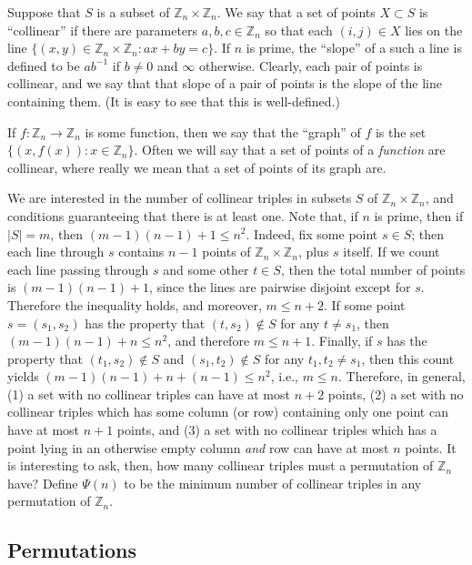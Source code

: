 \documentclass[12pt]{article}
\newcommand{\Z}{{\mathbb Z}}
\begin{document}
Suppose that $S$ is a subset of $\Z_n \times \Z_n$.  We say that a set of points $X \subset S$ is ``collinear'' if there are parameters $a,b,c \in \Z_n$ so that each $(i,j) \in X$ lies on the line $\{(x,y) \in \Z_n \times \Z_n : ax + by = c\}$.  If $n$ is prime, the ``slope'' of a such a line is defined to be $ab^{-1}$ if $b \neq 0$ and $\infty$ otherwise.  Clearly, each pair of points is collinear, and we say that that slope of a pair of points is the slope of the line containing them.  (It is easy to see that this is well-defined.)

If $f : \Z_n \rightarrow \Z_n$ is some function, then we say that the ``graph'' of $f$ is the set $\{(x,f(x)):x \in \Z_n\}$.  Often we will say that a set of points of a {\it function} are collinear, where really we mean that a set of points of its graph are.

We are interested in the number of collinear triples in subsets $S$ of $\Z_n \times \Z_n$, and conditions guaranteeing that there is at least one.  Note that, if $n$ is prime, then if $|S| = m$, then $(m-1)(n-1)+1 \leq n^2$.  Indeed, fix some point $s \in S$; then each line through $s$ contains $n-1$ points of $\Z_n \times \Z_n$, plus $s$ itself.  If we count each line passing through $s$ and some other $t \in S$, then the total number of points is $(m-1)(n-1)+1$, since the lines are pairwise disjoint except for $s$.  Therefore the inequality holds, and moreover, $m \leq n+2$.  If some point $s = (s_1,s_2)$ has the property that $(t,s_2) \not \in S$ for any $t \neq s_1$, then $(m-1)(n-1)+n \leq n^2$, and therefore $m \leq n+1$.  Finally, if $s$ has the property that $(t_1,s_2) \not \in S$ and $(s_1,t_2) \not \in S$ for any $t_1,t_2 \neq s_1$, then this count yields $(m-1)(n-1)+n+(n-1) \leq n^2$, i.e., $m \leq n$.  Therefore, in general, (1) a set with no collinear triples can have at most $n+2$ points, (2) a set with no collinear triples which has some column (or row) containing only one point can have at most $n+1$ points, and (3) a set with no collinear triples which has a point lying in an otherwise empty column {\it and} row can have at most $n$ points.  It is interesting to ask, then, how many collinear triples must a permutation of $\Z_n$ have?  Define $\Psi(n)$ to be the minimum number of collinear triples in any permutation of $\Z_n$.

\subsection{Permutations}
\end{document}
